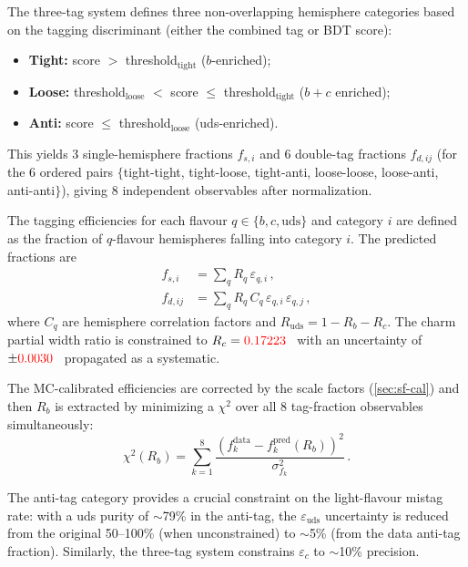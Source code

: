 \documentclass[11pt,a4paper]{article}
\newcommand{\external}[1]{\textcolor{red}{#1}}
\begin{document}
The three-tag system defines three non-overlapping hemisphere categories
based on the tagging discriminant (either the combined tag or BDT score):
\begin{itemize}
\item \textbf{Tight:} score $>$ threshold$_\mathrm{tight}$ ($b$-enriched);
\item \textbf{Loose:} threshold$_\mathrm{loose}$ $<$ score
  $\leq$ threshold$_\mathrm{tight}$ ($b + c$ enriched);
\item \textbf{Anti:} score $\leq$ threshold$_\mathrm{loose}$
  (uds-enriched).
\end{itemize}
This yields 3 single-hemisphere fractions $f_{s,i}$ and 6 double-tag
fractions $f_{d,ij}$ (for the 6 ordered pairs $\{$tight-tight,
tight-loose, tight-anti, loose-loose, loose-anti, anti-anti$\}$), giving
8 independent observables after normalization.

The tagging efficiencies for each flavour $q \in \{b, c, \mathrm{uds}\}$
and category $i$ are defined as the fraction of $q$-flavour hemispheres
falling into category $i$.  The predicted fractions are
\begin{align}
  f_{s,i}   &= \sum_q R_q\, \varepsilon_{q,i}\,, \label{eq:fs}\\
  f_{d,ij}  &= \sum_q R_q\, C_q\, \varepsilon_{q,i}\, \varepsilon_{q,j}\,,
  \label{eq:fd}
\end{align}
where $C_q$ are hemisphere correlation factors and $R_\mathrm{uds} =
1 - R_b - R_c$.  The charm partial width ratio is constrained to
$R_c = \external{0.17223}$~\cite{LEP:EWWG:2005} with an uncertainty
of $\pm\external{0.0030}$~\cite{LEP:EWWG:2005} propagated as a
systematic.

The MC-calibrated efficiencies are corrected by the scale factors
(\cref{sec:sf-cal}) and then $R_b$ is extracted by minimizing a
$\chi^2$ over all 8 tag-fraction observables simultaneously:
\begin{equation}
  \chi^2(R_b) = \sum_{k=1}^{8}
    \frac{\left(f_k^\mathrm{data} - f_k^\mathrm{pred}(R_b)\right)^2}
         {\sigma_{f_k}^2}\,.
  \label{eq:chi2-3tag}
\end{equation}

The anti-tag category provides a crucial constraint on the light-flavour
mistag rate: with a uds purity of $\sim$79\% in the anti-tag, the
$\varepsilon_\mathrm{uds}$ uncertainty is reduced from the original
50--100\% (when unconstrained) to $\sim$5\% (from the data anti-tag
fraction).  Similarly, the three-tag system constrains $\varepsilon_c$
to $\sim$10\% precision.
\end{document}
